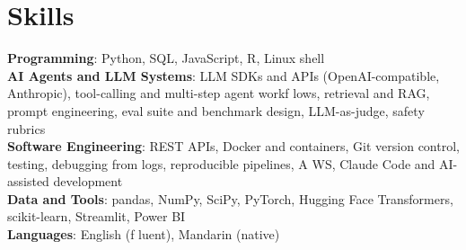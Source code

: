\documentclass[letterpaper,11pt]{article}
\begin{document}
\section{\textbf{Skills}}
 \begin{itemize}[leftmargin=0.15in, label={}]
    \small{\item{
     \textbf{Programming}{: Python, SQL, JavaScript, R, Linux shell} \\
     \textbf{AI Agents and LLM Systems}{: LLM SDKs and APIs (OpenAI-compatible, Anthropic), tool-calling and multi-step agent workf\kern0pt lows, retrieval and RAG, prompt engineering, eval suite and benchmark design, LLM-as-judge, safety rubrics} \\
     \textbf{Software Engineering}{: REST APIs, Docker and containers, Git version control, testing, debugging from logs, reproducible pipelines, A\kern0pt WS, Claude Code and AI-assisted development} \\
     \textbf{Data and Tools}{: pandas, NumPy, SciPy, PyTorch, Hugging Face Transformers, scikit-learn, Streamlit, Power BI} \\
     \textbf{Languages}{: English (f\kern0pt luent), Mandarin (native)}}}

 \end{itemize}
\end{document}
